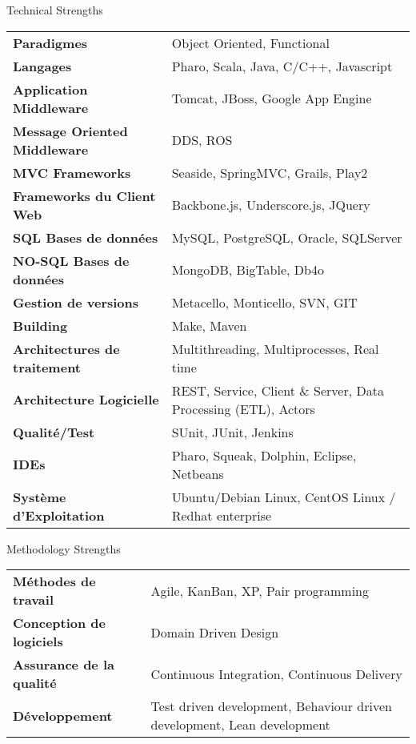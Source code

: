 \documentclass{resume} %
\begin{document}
\begin{rSection}{Technical Strengths}
	\begin{tabular}{ @{} >{\bfseries}l @{\hspace{6ex}} l }
		Paradigmes & Object Oriented, Functional \\
		Langages & Pharo, Scala, Java, C/C++, Javascript  \\
		Application Middleware & Tomcat, JBoss, Google App Engine \\
		Message Oriented Middleware & DDS, ROS \\
		MVC Frameworks &  Seaside, SpringMVC, Grails, Play2 \\
		Frameworks du Client Web & Backbone.js, Underscore.js, JQuery \\
		SQL Bases de donn\'{e}es & MySQL, PostgreSQL, Oracle, SQLServer  \\
		NO-SQL Bases de donn\'{e}es  & MongoDB, BigTable, Db4o  \\
		Gestion de versions & Metacello, Monticello, SVN, GIT \\
		Building & Make, Maven \\
		Architectures de traitement & Multithreading, Multiprocesses, Real time \\
		Architecture Logicielle & REST, Service,  Client \& Server, Data Processing (ETL), Actors\\
		Qualit\'{e}/Test & SUnit, JUnit, Jenkins \\
		IDEs & Pharo, Squeak, Dolphin, Eclipse, Netbeans \\
		Syst\`{e}me d'Exploitation & Ubuntu/Debian Linux, CentOS Linux / Redhat enterprise \\
	\end{tabular}
\end{rSection}

\begin{rSection}{Methodology Strengths}

\begin{tabular}{ @{} >{\bfseries}l @{\hspace{6ex}} l }
	
	M\'{e}thodes de travail & Agile, KanBan, XP, Pair programming  \\
	Conception de logiciels & Domain Driven Design  \\
	Assurance de la qualit\'{e} & Continuous Integration, Continuous Delivery \\
	D\'{e}veloppement & Test driven development, Behaviour driven development, Lean development \\
\end{tabular}

\end{rSection}
\end{document}
